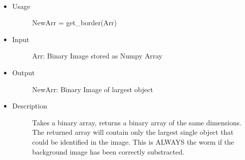 \documentclass[letterpaper,10pt,oneside]{sphinxmanual}
\begin{document}
\begin{fulllineitems}
\label{index:libcelegans.get_biggest_object}~\begin{itemize}
\item {} \begin{description}
\item[{Usage}] \leavevmode
NewArr = get\_border(Arr)

\end{description}

\item {} \begin{description}
\item[{Input }] \leavevmode
Arr: Binary Image stored as Numpy Array

\end{description}

\item {} \begin{description}
\item[{Output}] \leavevmode
NewArr: Binary Image of largest object

\end{description}

\item {} \begin{description}
\item[{Description}] \leavevmode
Takes a binary array, returns a binary array of the same dimensions.  
The returned array will contain only the largest single object that 
could be identified in the image.  This is ALWAYS the worm if the
background image has been correctly substracted.

\end{description}

\end{itemize}

\end{fulllineitems}

\end{document}
